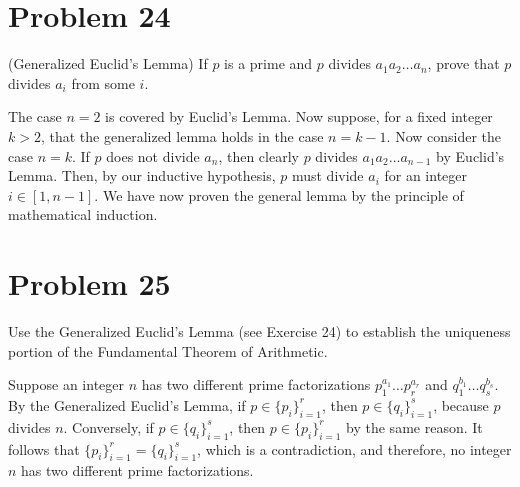 \documentclass[12pt]{article}
\begin{document}
\section*{Problem 24}

(Generalized Euclid's Lemma)  If $p$ is a prime and $p$ divides
$a_1a_2\dots a_n$, prove that $p$ divides $a_i$ from some $i$.

The case $n=2$ is covered by Euclid's Lemma.  Now suppose, for a fixed integer
$k>2$, that the generalized lemma holds in the case $n=k-1$.  Now
consider the case $n=k$.  If $p$ does not divide $a_n$, then
clearly $p$ divides $a_1a_2\dots a_{n-1}$ by Euclid's Lemma.
Then, by our inductive hypothesis, $p$ must divide $a_i$ for an
integer $i\in[1,n-1]$.  We have now proven the general lemma
by the principle of mathematical induction.

\section*{Problem 25}

Use the Generalized Euclid's Lemma (see Exercise 24) to establish the
uniqueness portion of the Fundamental Theorem of Arithmetic.

Suppose an integer $n$ has two different prime factorizations $p_1^{a_1}\dots p_r^{a_r}$
and $q_1^{b_1}\dots q_s^{b_s}$.  By the Generalized Euclid's Lemma, if
$p\in\{p_i\}_{i=1}^r$, then $p\in\{q_i\}_{i=1}^s$, because $p$ divides $n$.
Conversely, if $p\in\{q_i\}_{i=1}^s$, then $p\in\{p_i\}_{i=1}^r$ by the same reason.
It follows that $\{p_i\}_{i=1}^r=\{q_i\}_{i=1}^s$, which is a contradiction, and
therefore, no integer $n$ has two different prime factorizations.
\end{document}
